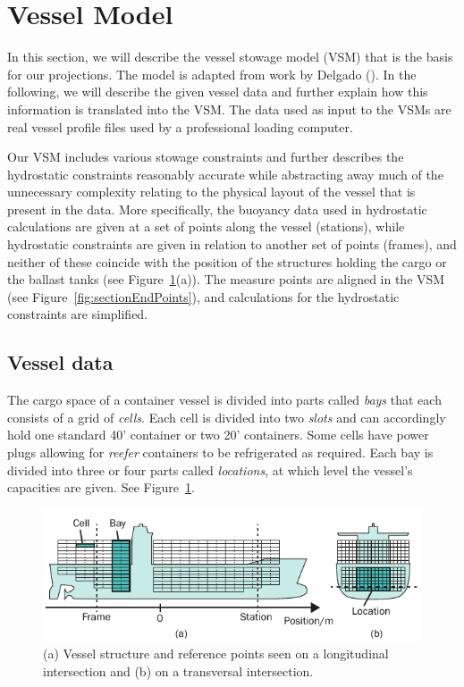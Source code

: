 %

%
\section{Vessel Model}\label{sec:VMs}
In this section, we will describe the vessel stowage model (VSM) that is the basis for our projections. The model is adapted from work by Delgado (\cite{AlbertosThesis}). In the following, we will describe the given vessel data and further explain how this information is translated into the VSM.
The data used as input to the VSMs are real vessel profile files used by a professional loading computer. 

Our VSM includes various stowage constraints and further {describes the hydrostatic constraints reasonably accurate while}
abstracting away much of the unnecessary complexity relating to the physical layout of the vessel that is present in the data. 
More specifically, the buoyancy data used in hydrostatic calculations are given at a set of points along the vessel (stations), while hydrostatic constraints are given in relation to another set of points (frames), and neither of these coincide with the position of the structures holding the cargo or the ballast tanks (see Figure~\ref{fig:vessel}(a)). The measure points are aligned in the VSM (see Figure~\ref{fig:sectionEndPoints}), and calculations for the hydrostatic constraints are simplified.

\subsection{Vessel data}
The cargo space of a container vessel is divided into parts called \textit{bays} that each consists of a grid of \emph{cells}. Each cell is divided into two \emph{slots} and can accordingly hold one standard 40' container or two 20' containers. Some cells have power plugs allowing for \emph{reefer} containers to be refrigerated as required. Each bay is divided into three or four parts called \textit{locations}, at which level the vessel's capacities are given. See Figure~\ref{fig:vessel}.

\begin{figure}[hb]
	\centering
		\includegraphics{figures/vessel2.pdf}
	\caption{(a) Vessel structure and reference points seen on a longitudinal intersection and (b) on a transversal intersection.}
	\label{fig:vessel}
\end{figure}

